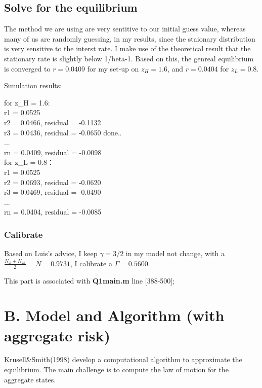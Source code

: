 \subsection{Solve for the equilibrium}

The method we are using are very sentitive to our initial guess value, whereas many of us are randomly guessing, in my results, since the staionary distribution is very sensitive to the interst rate. I make use of the theoretical result that the stationary rate is slightly 
 below 1/beta-1. Based on this, the genreal equilibrium is converged to $r = 0.0409$ for my set-up on $z_H = 1.6$, and  $r = 0.0404$ for $z_L = 0.8$. 

 Simulation results:

for z\_H = 1.6:\\
r1 = 0.0525\\
 r2 = 0.0466, residual = -0.1132\\
 r3 = 0.0436, residual = -0.0650 done..\\
 ...\\
 rn = 0.0409, residual = -0.0098\\
 for z\_L = 0.8：\\
 r1 = 0.0525\\
 r2 = 0.0693, residual = -0.0620\\
 r3 = 0.0469, residual = -0.0490\\
 ...\\
 rn = 0.0404, residual = -0.0085\\

\subsubsection{Calibrate}

Based on Luis's advice, I keep $\gamma=3/2$ in my model not change, with a $\frac{N_{zl}+ N_{zh}}{2}=\bar{N}=0.9731$, I calibrate a $\Gamma = 0.5600$.

This part is associated with {\color{red} \textbf{Q1main.m} line [388-500]};

\pagebreak

\section{B. Model and Algorithm (with aggregate risk)}
Krusell\&Smith(1998) develop a computational algorithm to approximate the equilibrium. The main challenge is to compute the law of motion for the aggregate states.

